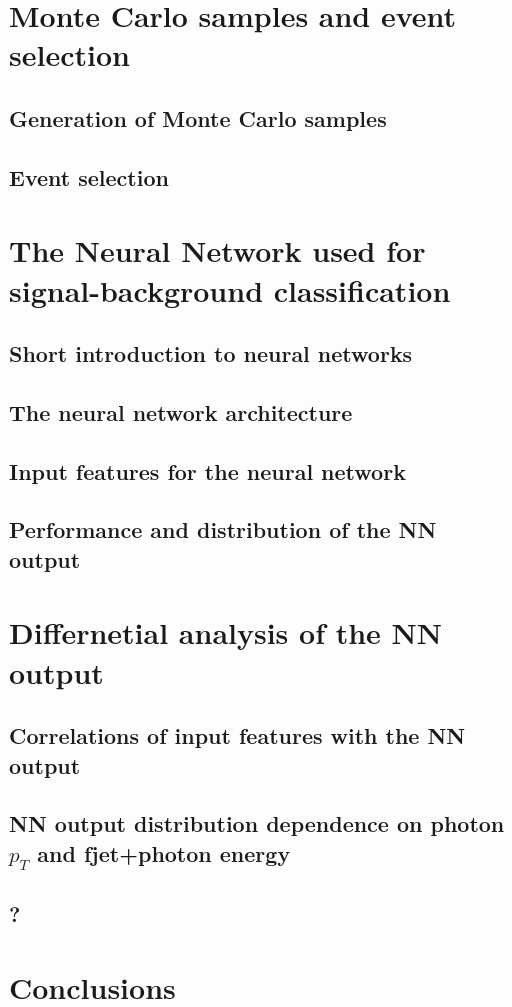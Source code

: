 \chapter{Monte Carlo samples and event selection}
\section{Generation of Monte Carlo samples}
\section{Event selection}
\chapter{The Neural Network used for signal-background classification}
\section{Short introduction to neural networks}
\section{The neural network architecture}
\section{Input features for the neural network}
\section{Performance and distribution of the NN output}
\chapter{Differnetial analysis of the NN output}
\section{Correlations of input features with the NN output}
\section{NN output distribution dependence on photon \texorpdfstring{$p_T$}{pT} and fjet+photon energy}
\section{?}
\chapter{Conclusions}
